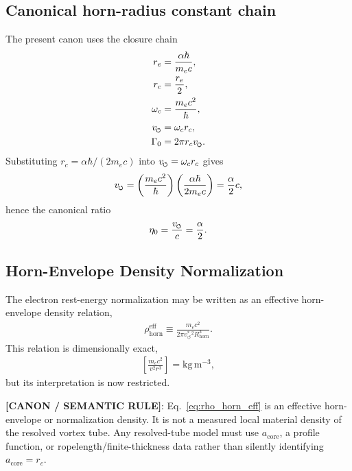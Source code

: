 \documentclass[11pt]{article}
\theoremstyle{definition}
\theoremstyle{plain}
\theoremstyle{remark}
\newcommand{\swirlarrow}{\mathchoice{\mkern-2mu\scriptstyle\boldsymbol{\circlearrowleft}}{\mkern-2mu\scriptstyle\boldsymbol{\circlearrowleft}}{\mkern-2mu\scriptscriptstyle\boldsymbol{\circlearrowleft}}{\mkern-2mu\scriptscriptstyle\boldsymbol{\circlearrowleft}}}
\newcommand{\rc}{{r_c}}
\newcommand{\vchar}{v_{\!\boldsymbol{\circlearrowleft}}^{\ast}}
\begin{document}
        \subsection{Canonical horn-radius constant chain}
            The present canon uses the closure chain
            \begin{align}
                r_e &= \frac{\alpha \hbar}{m_e c}, \\
                r_c &= \frac{r_e}{2}, \\
                \omega_c &= \frac{m_e c^2}{\hbar}, \\
                v_{\swirlarrow} &= \omega_c r_c, \\
                \Gamma_0 &= 2\pi r_c v_{\swirlarrow}.
            \end{align}
            Substituting $r_c = \alpha\hbar/(2m_e c)$ into $v_{\swirlarrow}=\omega_c r_c$ gives
            \begin{align}
                v_{\swirlarrow}
                =
                \left(\frac{m_e c^2}{\hbar}\right)
                \left(\frac{\alpha \hbar}{2m_e c}\right)
                = \frac{\alpha}{2}c,
            \end{align}
            hence the canonical ratio
            \begin{align}
                \eta_0 = \frac{v_{\swirlarrow}}{c} = \frac{\alpha}{2}.
            \end{align}

        \subsection{Horn-Envelope Density Normalization}
            The electron rest-energy normalization may be written as an effective horn-envelope density relation,
            \begin{align}
                \rho_{\mathrm{horn}}^{\mathrm{eff}}
                \equiv
                \frac{m_e c^2}{2\pi \vchar^2 R_{\mathrm{horn}}^3}.
                \label{eq:rho_horn_eff}
            \end{align}
            This relation is dimensionally exact,
            \begin{align}
                \left[\frac{m_e c^2}{v^2 r^3}\right]
                =
                \mathrm{kg\,m^{-3}},
            \end{align}
            but its interpretation is now restricted.

            \textbf{[CANON / SEMANTIC RULE]}: Eq.~\eqref{eq:rho_horn_eff} is an effective horn-envelope or normalization density. It is not a measured local material density of the resolved vortex tube. Any resolved-tube model must use $a_{\mathrm{core}}$, a profile function, or ropelength/finite-thickness data rather than silently identifying $a_{\mathrm{core}}=\rc$.
\end{document}
